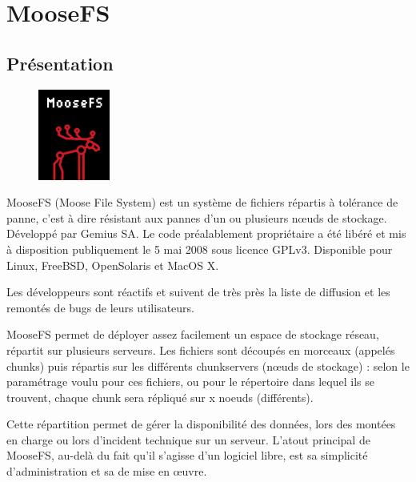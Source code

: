 \documentclass[12pt]{report}
\begin{document}
	\chapter{MooseFS}
		\section{Présentation}

			\begin{figure}[H]
				\begin{center}
					\includegraphics[width=0.15\linewidth]{images/moosefs.png}
				\end{center}
			\end{figure}
	
				
			MooseFS (Moose File System) est un système de fichiers répartis à tolérance de panne,
			c’est à dire résistant aux pannes d’un ou plusieurs nœuds de stockage.
			Développé par Gemius SA. Le code préalablement propriétaire a été libéré et mis à disposition publiquement le 5 mai 2008
			sous licence GPLv3. Disponible pour Linux, FreeBSD, OpenSolaris et MacOS X.

			Les développeurs sont réactifs et suivent de très près la liste de diffusion et les remontés de bugs de leurs utilisateurs.

			MooseFS permet de déployer assez facilement un espace de stockage réseau, répartit sur plusieurs serveurs. 
			Les fichiers sont découpés en morceaux (appelés chunks) puis répartis sur les différents chunkservers (nœuds de stockage) :
			selon le paramétrage voulu pour ces fichiers, ou pour le répertoire dans lequel ils se trouvent,
			chaque chunk sera répliqué sur x noeuds (différents).

			Cette répartition permet de gérer la disponibilité des données, lors des montées en charge ou lors d’incident technique
			sur un serveur. L'atout principal de MooseFS, au-delà du fait qu'il s’agisse d’un logiciel libre,
			est sa simplicité d'administration et sa de mise en œuvre.\\
\end{document}
